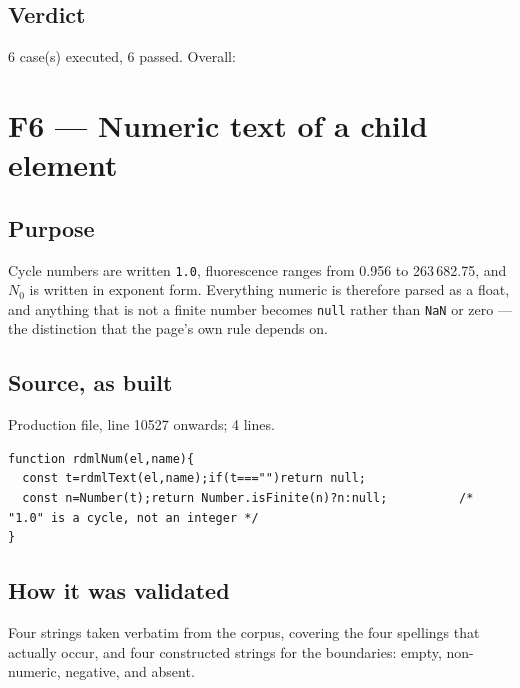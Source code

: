 \subsection*{Verdict}
6 case(s) executed, 6 passed. Overall: \PASS
\clearpage
\section{F6\quad{} --- Numeric text of a child element}
\label{sec:rdmlNum}
\subsection*{Purpose}
Cycle numbers are written \texttt{1.0}, fluorescence ranges from 0.956 to 263\,682.75, and
$N_0$ is written in exponent form. Everything numeric is therefore parsed as a float, and anything
that is not a finite number becomes \texttt{null} rather than \texttt{NaN} or zero --- the
distinction that the page's own  rule depends on.
\subsection*{Source, as built}
Production file, line 10527 onwards; 4 lines.
\begin{lstlisting}[style=js]
function rdmlNum(el,name){
  const t=rdmlText(el,name);if(t==="")return null;
  const n=Number(t);return Number.isFinite(n)?n:null;          /* "1.0" is a cycle, not an integer */
}
\end{lstlisting}

\subsection*{How it was validated}
Four strings taken verbatim from the corpus, covering the four spellings that actually
occur, and four constructed strings for the boundaries: empty, non-numeric, negative, and absent.
